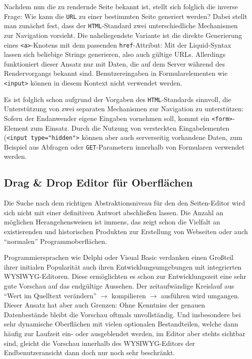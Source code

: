 Nachdem nun die zu rendernde Seite bekannt ist, stellt sich folglich die inverse Frage: Wie kann die \texttt{URL} zu einer bestimmten Seite generiert werden? Dabei stellt man zunächst fest, dass der \texttt{HTML}-Standard zwei unterschiedliche Mechanismen zur Navigation vorsieht. Die naheliegendste Variante ist die direkte Generierung eines \texttt{<a>}-Knotens mit dem passenden \texttt{href}-Attribut: Mit der Liquid-Syntax lassen sich beliebige Strings generieren, also auch gültige URLs. Allerdings funktioniert dieser Ansatz nur mit Daten, die auf dem Server während des Rendervorgangs bekannt sind. Benutzereingaben in Formularelementen wie \texttt{<input>} können in diesem Kontext nicht verwendet werden.

Es ist folglich schon aufgrund der Vorgaben des \texttt{HTML}-Standards sinnvoll, die Unterstützung von zwei separaten Mechanismen zur Navigation zu unterstützen: Sofern der Endanwender eigene Eingaben vornehmen soll, kommt ein \texttt{<form>}-Element zum Einsatz. Durch die Nutzung von versteckten Eingabelementen (\texttt{<input type="hidden">} können aber auch serverseitig vorhandene Daten, zum Beispiel aus Abfragen oder \texttt{GET}-Parametern innerhalb von Formularen verwendet werden.

\subsection{Drag \& Drop Editor für Oberflächen}
\label{sec:drag-drop-ui-editor}
Die Suche nach dem richtigen Abstraktionsniveau für den den Seiten-Editor wird sich nicht mit einer definitiven Antwort abschließen lassen. Die Anzahl an möglichen Herangehensweisen ist immens, das zeigt schon die Vielfalt an existierenden und historischen Produkten zur Erstellung von Webseiten oder auch "`normalen"' Programmoberflächen.

Programmiersprachen wie Delphi oder Visual Basic verdanken einen Großteil ihrer initialen Popularität auch ihren Entwicklungsumgebungen mit integrierten WYSIWYG-Editoren. Diese ermöglichten es schon zur Entwicklungszeit eine sehr gute Vorschau auf das endgültige Aussehen. Der zeitaufwändige Kreislauf aus "`Wert im Quelltext verändern"' $\rightarrow$  kompilieren $\rightarrow$ ausführen wird umgangen. Dieser Ansatz hat aber auch Grenzen: Ohne Kenntniss der genauen Datenbestände bleibt die Vorschau oftmals unvollständig. Und insbesondere bei sehr dynamische Oberflächen mit vielen optionalen Bestandteilen, welche dann häufig zur Laufzeit ein- oder ausgeblendet werden, im Editor aber stehts sichtbar sind, gleicht die Vorschau innerhalb des WYSIWYG-Editors der Endbenutzeransicht dann doch nur noch sehr beschränkt.

